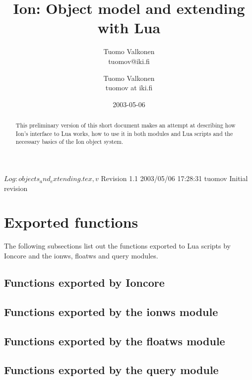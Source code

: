 \documentclass[english,a4paper,11pt,oldtoc]{artikel3}
\title{Ion: Object model and extending with Lua}
\author{Tuomo Valkonen \\ tuomov@iki.fi}
\author{Tuomo Valkonen \\ tuomov at iki.fi}
\date{2003-05-06}
\begin{document}
\maketitle

\begin{abstract}
This preliminary version of this short document makes
an attempt at
describing how Ion's interface to Lua works, how to use it in both
modules and Lua scripts and the necessary basics of the Ion object
system.
\end{abstract}

$Log: objects_and_extending.tex,v $
Revision 1.1  2003/05/06 17:28:31  tuomov
Initial revision
\\

\tableofcontents







\section{Exported functions}
\label{sec:exports}

The following subsections list out the functions exported to Lua scripts
by Ioncore and the ionws, floatws and query modules.

\subsection{Functions exported by Ioncore}



\subsection{Functions exported by the ionws module}



\subsection{Functions exported by the floatws module}



\subsection{Functions exported by the query module}



\printindex
\end{document}

